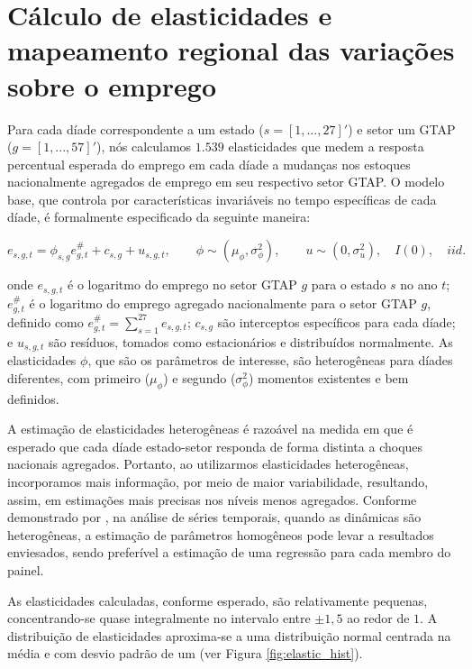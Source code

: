 \documentclass{article}
\begin{document}
\section{Cálculo de elasticidades e mapeamento regional das variações sobre o emprego}

Para cada díade correspondente a um estado ($s = [1,...,27]'$) e setor um GTAP ($g = [1,...,57]'$), nós calculamos $1.539$ elasticidades que medem a resposta percentual esperada do emprego em cada díade a mudanças nos estoques nacionalmente agregados de emprego em seu respectivo setor GTAP. O modelo base, que controla por características invariáveis no tempo específicas de cada díade, é formalmente especificado da seguinte maneira:

\begin{equation}
    e_{s,g,t} = \phi_{s,g}e_{g,t}^{\#} + c_{s,g} + u_{s,g,t}, \qquad \phi \sim (\mu_\phi,\sigma_\phi^2), \qquad u \sim (0,\sigma_u^2), \quad I(0), \quad iid.
    \label{equation:painel}
\end{equation}

onde $e_{s,g,t}$ é o logaritmo do emprego no setor GTAP $g$ para o estado $s$ no ano $t$; $e_{g,t}^{\#}$ é o logaritmo do emprego agregado nacionalmente para o setor GTAP $g$, definido como $e_{g,t}^{\#} = \sum_{s=1}^{27} e_{s,g,t}$; $c_{s,g}$ são interceptos específicos para cada díade; e $u_{s,g,t}$  são resíduos, tomados como estacionários e distribuídos normalmente. As elasticidades $\phi$, que são os parâmetros de interesse, são heterogêneas para díades diferentes, com primeiro ($\mu_\phi$) e segundo ($\sigma_\phi^2$) momentos existentes e bem definidos.

A estimação de elasticidades heterogêneas é razoável na medida em que é esperado que cada díade estado-setor responda de forma distinta a choques nacionais agregados. Portanto, ao utilizarmos elasticidades heterogêneas, incorporamos mais informação, por meio de maior variabilidade, resultando, assim, em estimações mais precisas nos níveis menos agregados. Conforme demonstrado por \textcite{pesaran}, na análise de séries temporais, quando as dinâmicas são heterogêneas, a estimação de parâmetros homogêneos pode levar a resultados enviesados, sendo preferível a estimação de uma regressão para cada membro do painel.

As elasticidades calculadas, conforme esperado, são relativamente pequenas, concentrando-se quase integralmente no intervalo entre $\pm1,5$ ao redor de $1$. A distribuição de elasticidades aproxima-se a uma distribuição normal centrada na média e com desvio padrão de um (ver Figura \ref{fig:elastic_hist}).
\end{document}
